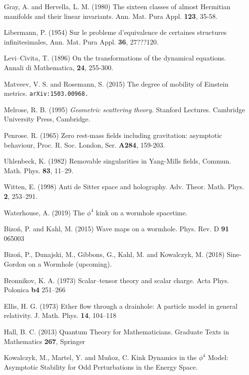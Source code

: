 \begin{thebibliography}{}
Gray, A. and Hervella, L. M. (1980) The sixteen classes of almost Hermitian manifolds and their linear
invariants. Ann. Mat. Pura Appl. {\bf 123}, 35-58.

Libermann, P. (1954) Sur le probleme d'equivalence de certaines structures infinitesimales, Ann.
Mat. Pura Appl. {\bf 36}, 27???120.


 Levi--Civita, T. (1896) On the transformations of the 
dynamical equations. Annali di Mathematica, {\bf 24}, 255-300.

 Matveev, V. S. and Rosemann, S. (2015)
The degree of mobility of Einstein metrics.
{\tt arXiv:1503.00968.}


Melrose, R. B. (1995)
{\em Geometric scattering theory.} Stanford Lectures. Cambridge University Press,
Cambridge.

Penrose. R. (1965) Zero rest-mass fields including gravitation: asymptotic behaviour, Proc. R. 
Soc. London, Ser. {\bf A284}, 159-203.

 Uhlenbeck, K. (1982) Removable singularities in Yang-Mills fields,
Commun. Math. Phys. {\bf 83}, 11--29.

 Witten, E. (1998)
Anti de Sitter space and holography. Adv. Theor. Math. Phys. {\bf 2}, 253--291.


 Waterhouse, A. (2019)
The $\phi^4$ kink on a wormhole spacetime.

 Bizo\'n, P. and Kahl, M. (2015)
Wave maps on a wormhole. Phys. Rev. D {\bf 91} 065003

 Bizo\'n, P., Dunajski, M., Gibbons, G., Kahl, M. and Kowalczyk, M. (2018) Sine-Gordon on a Wormhole (upcoming).

 Bronnikov, K. A. (1973)
Scalar--tensor theory and scalar charge. Acta Phys. Polonica {\bf b4} 251--266

 Ellis, H. G. (1973)
Ether flow through a drainhole: A particle model in general relativity. J. Math. Phys. {\bf 14}, 104--118

 Hall, B. C. (2013)
Quantum Theory for Mathematicians. Graduate Texts in Mathematics {\bf 267}, Springer

 Kowalczyk, M., Martel, Y. and Mu\~noz, C.
Kink Dynamics in the $\phi^4$ Model: Asymptotic Stability for Odd Perturbations in the Energy Space. 


\end{thebibliography}
